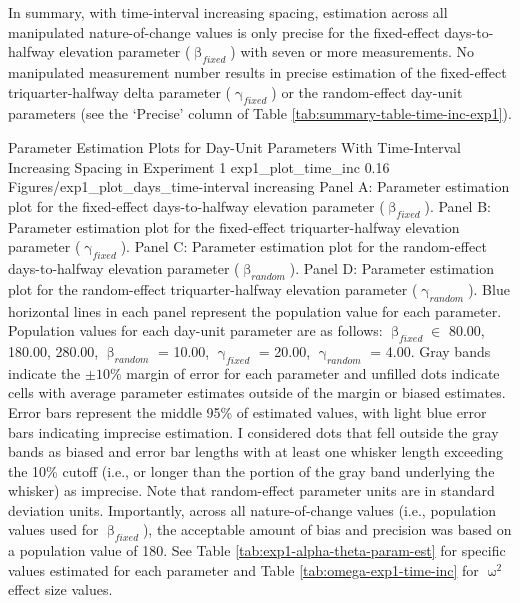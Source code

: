 \documentclass[
12pt, %
twoside,
english]{guelphthesis}
\theoremstyle{definition}
\theoremstyle{definition}
\theoremstyle{definition}
\theoremstyle{definition}
\theoremstyle{remark}
\begin{document}
In summary, with time-interval increasing spacing, estimation across all manipulated nature-of-change values is only precise for the fixed-effect days-to-halfway elevation parameter (\(\upbeta_{fixed}\)) with seven or more measurements. No manipulated measurement number results in precise estimation of the fixed-effect triquarter-halfway delta parameter (\(\upgamma_{fixed}\)) or the random-effect day-unit parameters (see the `Precise' column of Table \ref{tab:summary-table-time-inc-exp1}).
\begin{apaFigure}
[portrait]
[samepage]
[-0.2cm]
{Parameter Estimation Plots for Day-Unit Parameters With Time-Interval Increasing Spacing in Experiment 1}
{exp1_plot_time_inc}
{0.16}
{Figures/exp1_plot_days_time-interval increasing}
{Panel A: Parameter estimation plot for the fixed-effect days-to-halfway elevation parameter ($\upbeta_{fixed}$). Panel B: Parameter estimation plot for the fixed-effect triquarter-halfway elevation parameter ($\upgamma_{fixed}$). Panel C: Parameter estimation plot for the random-effect days-to-halfway elevation parameter ($\upbeta_{random}$). Panel D: Parameter estimation plot for the random-effect triquarter-halfway elevation parameter ($\upgamma_{random}$). Blue horizontal lines in each panel represent the population value for each parameter. Population values for each day-unit parameter are as follows: $\upbeta_{fixed} \in$ {80.00, 180.00, 280.00}, $\upbeta_{random}$ = 10.00, $\upgamma_{fixed}$ = 20.00, $\upgamma_{random}$ = 4.00. Gray bands indicate the $\pm 10\%$ margin of error for each parameter and unfilled dots indicate cells with average parameter estimates outside of the margin or biased estimates. Error bars represent the middle 95\% of estimated values, with light blue error bars indicating imprecise estimation. I considered dots that fell outside the gray bands as biased and error bar lengths with at least one whisker length exceeding the 10\% cutoff (i.e., or longer than the portion of the gray band underlying the whisker) as imprecise. Note that random-effect parameter units are in standard deviation units. Importantly, across all nature-of-change values (i.e., population values used for $\upbeta_{fixed}$), the acceptable amount of bias and precision was based on a population value of 180. See Table \ref{tab:exp1-alpha-theta-param-est} for specific values estimated for each parameter and Table \ref{tab:omega-exp1-time-inc} for $\upomega^2$ effect size values.}
\end{apaFigure}
\end{document}
